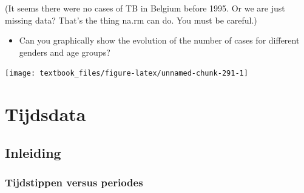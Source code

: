 \documentclass[]{tufte-book}
\newenvironment{Shaded}{}{}
\newcommand{\DataTypeTok}[1]{\textcolor[rgb]{0.56,0.13,0.00}{#1}}
\newcommand{\DecValTok}[1]{\textcolor[rgb]{0.25,0.63,0.44}{#1}}
\newcommand{\KeywordTok}[1]{\textcolor[rgb]{0.00,0.44,0.13}{\textbf{#1}}}
\newcommand{\NormalTok}[1]{#1}
\newcommand{\OperatorTok}[1]{\textcolor[rgb]{0.40,0.40,0.40}{#1}}
\newcommand{\StringTok}[1]{\textcolor[rgb]{0.25,0.44,0.63}{#1}}
\providecommand{\tightlist}{%
  \setlength{\itemsep}{0pt}\setlength{\parskip}{0pt}}
\begin{document}
(It seems there were no cases of TB in Belgium before 1995. Or we are just missing data? That's the thing na.rm can do. You must be careful.)

\begin{itemize}
\tightlist
\item
  Can you graphically show the evolution of the number of cases for different genders and age groups?
\end{itemize}

\begin{Shaded}
\end{Shaded}

\texttt{[image: textbook\_files/figure-latex/unnamed-chunk-291-1]}

\hypertarget{tijdsdata}{%
\chapter{Tijdsdata}\label{tijdsdata}}

\hypertarget{inleiding-1}{%
\section{Inleiding}\label{inleiding-1}}

\hypertarget{tijdstippen-versus-periodes}{%
\subsection{Tijdstippen versus periodes}\label{tijdstippen-versus-periodes}}
\end{document}
